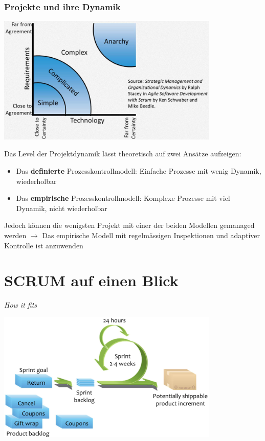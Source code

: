 \documentclass{report}
\newenvironment{Figure}
	{\par\medskip\noindent\minipage{\linewidth}}
	{\endminipage\par\medskip}
\theoremstyle{definition}
\theoremstyle{example}
\begin{document}
\subsubsection{Projekte und ihre Dynamik}
\begin{Figure}
\centering
\includegraphics[width=400px]{img/Projektdynamik.png}
	\label{fig:Projekte und ihre Dynamik}
\end{Figure}

Das Level der Projektdynamik lässt theoretisch auf zwei Ansätze aufzeigen:
\begin{itemize}
	\item Das \textbf{definierte} Prozesskontrollmodell: Einfache Prozesse mit wenig Dynamik, wiederholbar
	\item Das \textbf{empirische} Prozesskontrollmodell: Komplexe Prozesse mit viel Dynamik, nicht wiederholbar
\end{itemize}
Jedoch können die wenigsten Projekt mit einer der beiden Modellen gemanaged werden $\rightarrow$ Das empirische Modell mit regelmässigen Inspektionen und adaptiver Kontrolle ist anzuwenden

\section{SCRUM auf einen Blick}
\textit{How it fits}
\begin{Figure}
\centering
\includegraphics[width=400px]{img/HowScrumFits.png}
	\label{fig:How Scrum fits}
\end{Figure}
\end{document}
